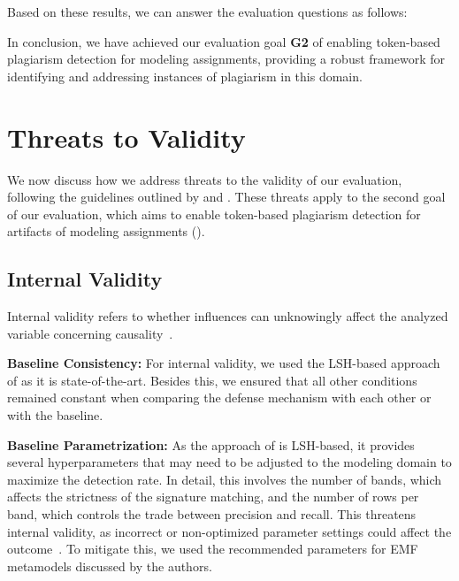 Based on these results, we can answer the evaluation questions as follows:

In conclusion, we have achieved our evaluation goal \textbf{G2} of enabling token-based plagiarism detection for modeling assignments, providing a robust framework for identifying and addressing instances of plagiarism in this domain.

\section{Threats to Validity}
We now discuss how we address threats to the validity of our evaluation, following the guidelines outlined by \citet{Wohlin2012} and \citet{runeson2008}. These threats apply to the second goal of our evaluation, which aims to enable token-based plagiarism detection for artifacts of modeling assignments ().


\subsection{Internal Validity}
Internal validity refers to whether influences can unknowingly affect the analyzed variable concerning causality~\cite{Wohlin2012}.

    \textbf{Baseline Consistency:} For internal validity, we used the LSH-based approach of \citet{Martinez2020} as it is state-of-the-art. Besides this, we ensured that all other conditions remained constant when comparing the defense mechanism with each other or with the baseline. 

    \textbf{Baseline Parametrization:} As the approach of \citet{Martinez2020} is LSH-based, it provides several hyperparameters that may need to be adjusted to the modeling domain to maximize the detection rate. In detail, this involves the number of bands, which affects the strictness of the signature matching, and the number of rows per band, which controls the trade between precision and recall. This threatens internal validity, as incorrect or non-optimized parameter settings could affect the outcome~\cite{novak2018}. To mitigate this, we used the recommended parameters for \ac{EMF} metamodels discussed by the authors.

